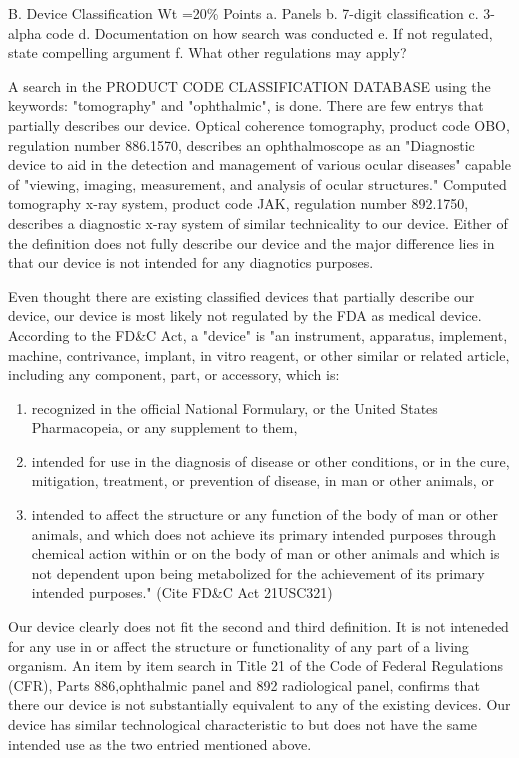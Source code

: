 \documentclass{article}
\begin{document}
B. Device Classification Wt =20\% Points
a. Panels
b. 7-digit classification
c. 3-alpha code
d. Documentation on how search was conducted
e. If not regulated, state compelling argument
f. What other regulations may apply?

A search in the PRODUCT CODE CLASSIFICATION DATABASE using the
keywords: "tomography" and "ophthalmic", is done. There are few entrys
that partially describes our device. Optical coherence tomography,
product code OBO, regulation number 886.1570, describes an
ophthalmoscope as an "Diagnostic device to aid in the detection and
management of various ocular diseases" capable of "viewing, imaging,
measurement, and analysis of ocular structures."  Computed tomography
x-ray system, product code JAK, regulation number 892.1750, describes
a diagnostic x-ray system of similar technicality to our
device. Either of the definition does not fully describe our device
and the major difference lies in that our device is not intended for
any diagnotics purposes.

Even thought there are existing classified devices that partially
describe our device, our device is most likely not regulated by the
FDA as medical device. According to the FD\&C Act, a "device" is "an
instrument, apparatus, implement, machine, contrivance, implant, in
vitro reagent, or other similar or related article, including any
component, part, or accessory, which is:

\begin{enumerate}
\item recognized in the official National Formulary, or the United
  States Pharmacopeia, or any supplement to them,
\item intended for use in the diagnosis of disease or other
  conditions, or in the cure, mitigation, treatment, or prevention of
  disease, in man or other animals, or
\item intended to affect the structure or any function of the body of
  man or other animals, and which does not achieve its primary
  intended purposes through chemical action within or on the body of
  man or other animals and which is not dependent upon being
  metabolized for the achievement of its primary intended purposes."
  (Cite FD\&C Act 21USC321)
\end{enumerate}

Our device clearly does not fit the second and third definition. It is
not inteneded for any use in or affect the structure or functionality
of any part of a living organism. An item by item search in Title 21
of the Code of Federal Regulations (CFR), Parts 886,ophthalmic panel
and 892 radiological panel, confirms that there our device is not
substantially equivalent to any of the existing devices. Our device
has similar technological characteristic to but does not have the same
intended use as the two entried mentioned above.
\end{document}
